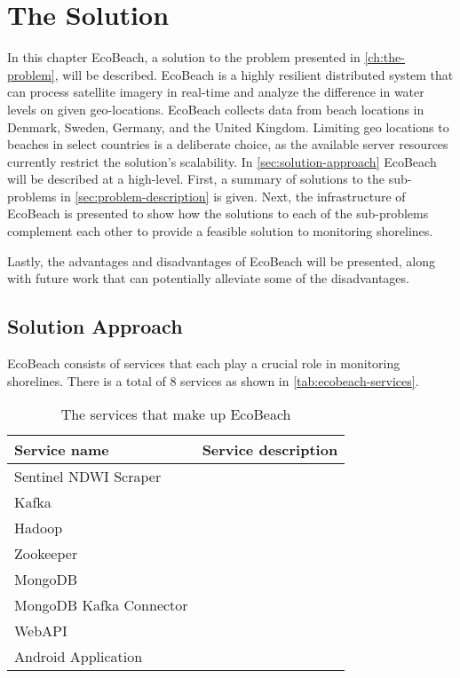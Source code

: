 \chapter{The Solution}

In this chapter EcoBeach, a solution to the problem presented in \autoref{ch:the-problem}, will be described. EcoBeach is a highly resilient distributed system that can process satellite imagery in real-time and analyze the difference in water levels on given geo-locations.
EcoBeach collects data from beach locations in Denmark, Sweden, Germany, and the United Kingdom. Limiting geo locations to beaches in select countries is a deliberate choice, as the available server resources currently restrict the solution's scalability.\medbreak
\noindent
In \autoref{sec:solution-approach}  EcoBeach will be described at a high-level. First, a summary of solutions to the sub-problems in \autoref{sec:problem-description} is given. Next, the infrastructure of EcoBeach is presented to show how the solutions to each of the sub-problems complement each other to provide a feasible solution to monitoring shorelines.

Lastly, the advantages and disadvantages of EcoBeach will be presented, along with future work that can potentially alleviate some of the disadvantages.

\section{Solution Approach}\label{sec:solution-approach}

EcoBeach consists of services that each play a crucial role in monitoring shorelines. There is a total of 8 services as shown in \autoref{tab:ecobeach-services}.

\begin{table}[]
    \centering
    \begin{tabular}{|l|l|}
        \hline
        \textbf{Service name}   & \textbf{Service description} \\ \hline
        Sentinel NDWI Scraper   &                              \\\hline
        Kafka                   &                              \\\hline
        Hadoop                  &                              \\\hline
        Zookeeper               &                              \\\hline
        MongoDB                 &                              \\\hline
        MongoDB Kafka Connector &                              \\\hline
        WebAPI                  &                              \\\hline
        Android Application     &                              \\\hline
    \end{tabular}
    \caption{The services that make up EcoBeach}
    \label{tab:ecobeach-services}
\end{table}


